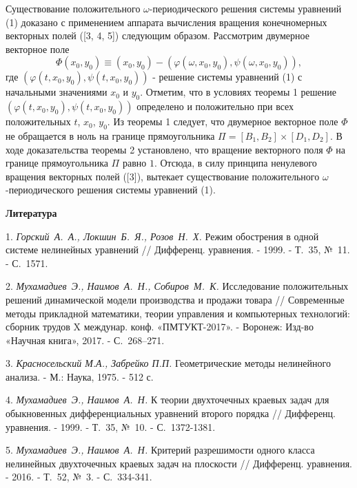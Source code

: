Существование положительного $\omega$-периодического решения
системы уравнений (1) доказано с применением аппарата вычисления
вращения конечномерных векторных полей ([3, 4, 5]) следующим
образом. Рассмотрим двумерное векторное поле
$$
\Phi(x_0,y_0)\equiv(x_0,y_0)-(\varphi(\omega,x_0,y_0),\psi(\omega,x_0,y_0)),
$$
где $(\varphi(t,x_0,y_0),\psi(t,x_0,y_0))$ - решение системы
уравнений (1) с начальными значениями $x_0$ и $y_0$. Отметим, что
в условиях теоремы 1 решение
$(\varphi(t,x_0,y_0),\psi(t,x_0,y_0))$ определено и положительно
при всех положительных $t$, $x_0$, $y_0$. Из теоремы 1 следует,
что двумерное векторное поле $\Phi$ не обращается в ноль на
границе прямоугольника $\Pi=[B_1, B_2]\times[D_1, D_2]$. В ходе
доказательства теоремы 2 установлено, что вращение векторного поля
$\Phi$ на границе прямоугольника $\Pi$ равно $1$. Отсюда, в силу
принципа ненулевого вращения векторных полей ([3]), вытекает
существование положительного $\omega$-периодического решения
системы уравнений (1).


\smallskip \centerline{\bf Литература}\nopagebreak

1. {\it  Горский~А.~А., Локшин~Б.~Я., Розов~Н.~Х. } Режим
обострения в одной системе нелинейных уравнений // Дифференц.
уравнения. - 1999. - Т.~35, №~11. - С.~1571.


2. {\it Мухамадиев~Э., Наимов~А.~Н., Собиров~М.~К. } Исследование
положительных решений динамической модели производства и продажи
товара // Современные методы прикладной математики, теории
управления и компьютерных технологий: сборник трудов X междунар.
конф. «ПМТУКТ-2017».  - Воронеж: Изд-во  «Научная книга», 2017. -
С.~268–271.


3. {\it Красносельский М.А., Забрейко П.П. } Геометрические методы
нелинейного анализа. - М.: Наука, 1975. - 512 с.


4. {\it Мухамадиев~Э., Наимов~А.~Н.} К теории двухточечных краевых
задач для обыкновенных дифференциальных уравнений второго порядка
// Дифференц. уравнения. - 1999. - Т.~35, №~10. - С.~1372-1381.


5. {\it Мухамадиев~Э., Наимов~А.~Н.} Критерий разрешимости одного
класса нелинейных двухточечных краевых задач на плоскости
// Дифференц. уравнения. - 2016. - Т.~52, №~3. - С.~334-341.


